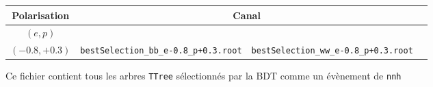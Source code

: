 

\begin{figure}[!ht]
	\centering
	\begin{tabular}{ | c | c | c | c | }
		\hline
		Polarisation & \multicolumn{2}{c|}{Canal} \\
		\hline
		$(e,p)$ & \bb &  \WW \\
		\hline
		\hline \cline{2-3}
		$(-0.8, +0.3)$ & \verb|bestSelection_bb_e-0.8_p+0.3.root| & \verb|bestSelection_ww_e-0.8_p+0.3.root| \\
		\hline
	\end{tabular}
	\label{files:bestSelection}
	\caption{Ce fichier \ROOT contient tous les arbres \texttt{TTree} 
		sélectionnés par la BDT comme un évènement de \texttt{nnh}}
\end{figure}